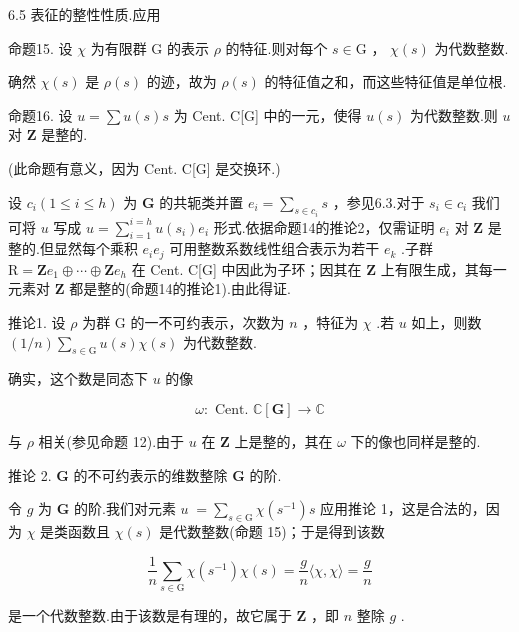 \documentclass[10pt]{article}
\begin{document}
6.5 表征的整性性质.应用

命题15. 设 \(\chi\) 为有限群 G 的表示 \(\rho\) 的特征.则对每个 \(s \in  \mathrm{G}\) ， \(\chi \left( s\right)\) 为代数整数.

确然 \(\chi \left( s\right)\) 是 \(\rho \left( s\right)\) 的迹，故为 \(\rho \left( s\right)\) 的特征值之和，而这些特征值是单位根.

命题16. 设 \(u = \sum u\left( s\right) s\) 为 Cent. C[G] 中的一元，使得 \(u\left( s\right)\) 为代数整数.则 \(u\) 对 \(\mathbf{Z}\) 是整的.

(此命题有意义，因为 Cent. C[G] 是交换环.)

设 \({c}_{i}\left( {1 \leq  i \leq  h}\right)\) 为 \(\mathbf{G}\) 的共轭类并置 \({e}_{i} = \mathop{\sum }\limits_{{s \in  {c}_{i}}}s\) ，参见6.3.对于 \({s}_{i} \in  {c}_{i}\) 我们可将 \(u\) 写成 \(u = \mathop{\sum }\limits_{{i = 1}}^{{i = h}}u\left( {s}_{i}\right) {e}_{i}\) 形式.依据命题14的推论2，仅需证明 \({e}_{i}\) 对 \(\mathbf{Z}\) 是整的.但显然每个乘积 \({e}_{i}{e}_{j}\) 可用整数系数线性组合表示为若干 \({e}_{k}\) .子群 \(\mathrm{R} = \mathbf{Z}{e}_{1} \oplus  \cdots  \oplus  \mathbf{Z}{e}_{h}\) 在 Cent. C[G] 中因此为子环；因其在 \(\mathbf{Z}\) 上有限生成，其每一元素对 \(\mathbf{Z}\) 都是整的(命题14的推论1).由此得证.

推论1. 设 \(\rho\) 为群 \(\mathrm{G}\) 的一不可约表示，次数为 \(n\) ，特征为 \(\chi\) .若 \(u\) 如上，则数 \(\left( {1/n}\right) \mathop{\sum }\limits_{{s \in  \mathrm{G}}}u\left( s\right) \chi \left( s\right)\) 为代数整数.

确实，这个数是同态下 \(u\) 的像

\[
\omega  : \text{ Cent. }\mathbb{C}\left\lbrack  \mathbf{G}\right\rbrack   \rightarrow  \mathbb{C}
\]

与 \(\rho\) 相关(参见命题 12).由于 \(u\) 在 \(\mathbf{Z}\) 上是整的，其在 \(\omega\) 下的像也同样是整的.

推论 2. \(\mathbf{G}\) 的不可约表示的维数整除 \(\mathbf{G}\) 的阶.

令 \(g\) 为 \(\mathbf{G}\) 的阶.我们对元素 \(u \; = \mathop{\sum }\limits_{{s \in  \mathrm{G}}}\chi \left( {s}^{-1}\right) s\) 应用推论 1，这是合法的，因为 \(\chi\) 是类函数且 \(\chi \left( s\right)\) 是代数整数(命题 15)；于是得到该数

\[
\frac{1}{n}\mathop{\sum }\limits_{{s \in  \mathrm{G}}}\chi \left( {s}^{-1}\right) \chi \left( s\right)  = \frac{g}{n}\langle \chi ,\chi \rangle  = \frac{g}{n}
\]

是一个代数整数.由于该数是有理的，故它属于 \(\mathbf{Z}\) ，即 \(n\) 整除 \(g\) .
\end{document}
